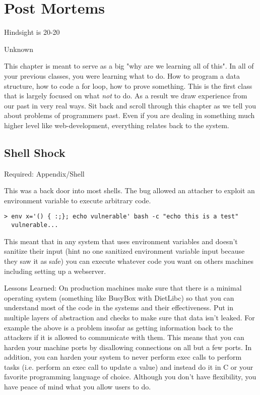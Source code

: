 \chapter{Post Mortems}

\epigraph{Hindsight is 20-20}{Unknown}

This chapter is meant to serve as a big "why are we learning all of this". In all of your previous classes, you were learning what to do. How to program a data structure, how to code a for loop, how to prove something. This is the first class that is largely focused on what \textit{not} to do. As a result we draw experience from our past in very real ways. Sit back and scroll through this chapter as we tell you about problems of programmers past. Even if you are dealing in something much higher level like web-development, everything relates back to the system.

\section{Shell Shock}

Required: Appendix/Shell

This was a back door into most shells. The bug allowed an attacher to exploit an environment variable to execute arbitrary code.

\begin{lstlisting}[language=console]
  > env x='() { :;}; echo vulnerable' bash -c "echo this is a test"
  vulnerable...
\end{lstlisting}

This meant that in any system that uses environment variables and doesn't sanitize their input (hint no one sanitized environment variable input because they saw it as safe) you can execute whatever code you want on others machines including setting up a webserver.

Lessons Learned: On production machines make sure that there is a minimal operating system (something like BusyBox with DietLibc) so that you can understand most of the code in the systems and their effectiveness. Put in multiple layers of abstraction and checks to make sure that data isn't leaked. For example the above is a problem insofar as getting information back to the attackers if it is allowed to communicate with them. This means that you can harden your machine ports by disallowing connections on all but a few ports. In addition, you can harden your system to never perform exec calls to perform tasks (i.e. perform an exec call to update a value) and instead do it in C or your favorite programming language of choice. Although you don't have flexibility, you have peace of mind what you allow users to do.

